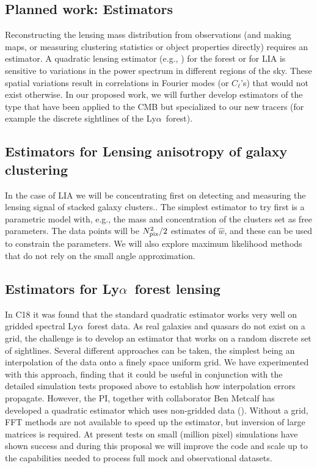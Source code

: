 \documentclass[12pt]{article}
\def\lya{Ly$\alpha$}
\begin{document}
\begin{small}
\section{Planned work: Estimators}

Reconstructing the lensing mass distribution from observations
(and making maps, or measuring
clustering statistics or object properties directly) requires  an
estimator. 
A quadratic lensing estimator (e.g., \cite{okamoto}) for the forest or for LIA
is sensitive to variations in the power spectrum in  different 
regions of the sky.  These spatial variations result in
correlations in Fourier modes (or $C_\ell$'s) that would not
exist otherwise. 
In our proposed work, we will further develop estimators
of the type that have been applied to the CMB but specialized to our
new tracers (for example the discrete sightlines of the \lya\ forest).

\subsection{Estimators for Lensing anisotropy of galaxy clustering}

In the case of LIA we will be concentrating first on detecting and
measuring the lensing signal of stacked galaxy clusters..
The simplest estimator to try first is a parametric model with,
e.g., the mass and concentration of the clusters set as free
parameters. The data points will be   $N_{\rm pix}^2/2$
estimates of $\hat w$, and these
can be used to constrain the parameters.
We will also explore maximum likelihood methods
that do not rely on the small angle approximation.

\subsection{Estimators for \lya\ forest lensing}
In C18 it was found that the standard quadratic estimator works 
very well on gridded spectral \lya\ forest data. As real
galaxies and quasars do not exist on a grid, the challenge is
to develop an estimator that works on a random discrete set of sightlines.
Several different approaches can be taken, the simplest being an interpolation
of the data onto a finely space uniform grid. We have experimented with this
approach, finding that it could be useful in conjunction with the detailed
simulation tests proposed above to establish how interpolation errors 
propagate. However, the PI, together with collaborator Ben Metcalf has 
developed a quadratic estimator which uses non-gridded data 
(\cite{metcalf17}). Without a grid, FFT methods are not available to 
speed up the estimator, but inversion of large matrices is required. At 
present tests on small (million pixel) simulations have shown success and
during this proposal we will improve the code and scale up to the capabilities
needed to process full mock and observational datasets.


\end{small}
\end{document}
